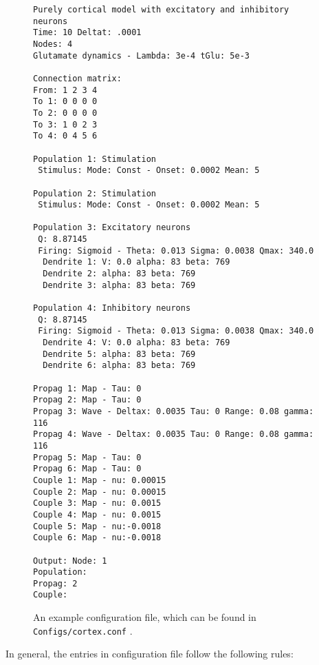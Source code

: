 \documentclass[12pt,a4paper]{article}
\newcommand{\type}[1]{ {\small\small\tt #1} }
\begin{document}
\begin{figure}\begin{center}
	\begin{lstlisting}
Purely cortical model with excitatory and inhibitory neurons
Time: 10 Deltat: .0001 
Nodes: 4
Glutamate dynamics - Lambda: 3e-4 tGlu: 5e-3

Connection matrix:
From: 1 2 3 4
To 1: 0 0 0 0
To 2: 0 0 0 0
To 3: 1 0 2 3
To 4: 0 4 5 6

Population 1: Stimulation
 Stimulus: Mode: Const - Onset: 0.0002 Mean: 5

Population 2: Stimulation
 Stimulus: Mode: Const - Onset: 0.0002 Mean: 5

Population 3: Excitatory neurons
 Q: 8.87145
 Firing: Sigmoid - Theta: 0.013 Sigma: 0.0038 Qmax: 340.0
  Dendrite 1: V: 0.0 alpha: 83 beta: 769
  Dendrite 2: alpha: 83 beta: 769
  Dendrite 3: alpha: 83 beta: 769

Population 4: Inhibitory neurons
 Q: 8.87145
 Firing: Sigmoid - Theta: 0.013 Sigma: 0.0038 Qmax: 340.0
  Dendrite 4: V: 0.0 alpha: 83 beta: 769
  Dendrite 5: alpha: 83 beta: 769
  Dendrite 6: alpha: 83 beta: 769

Propag 1: Map - Tau: 0
Propag 2: Map - Tau: 0
Propag 3: Wave - Deltax: 0.0035 Tau: 0 Range: 0.08 gamma: 116
Propag 4: Wave - Deltax: 0.0035 Tau: 0 Range: 0.08 gamma: 116
Propag 5: Map - Tau: 0
Propag 6: Map - Tau: 0
Couple 1: Map - nu: 0.00015
Couple 2: Map - nu: 0.00015
Couple 3: Map - nu: 0.0015
Couple 4: Map - nu: 0.0015
Couple 5: Map - nu:-0.0018
Couple 6: Map - nu:-0.0018

Output: Node: 1
Population: 
Propag: 2
Couple: 
	\end{lstlisting}
\end{center}
\caption{An example configuration file, which can be found in \type{Configs/cortex.conf}.}
\end{figure}

In general, the entries in configuration file follow the following rules:
\end{document}
